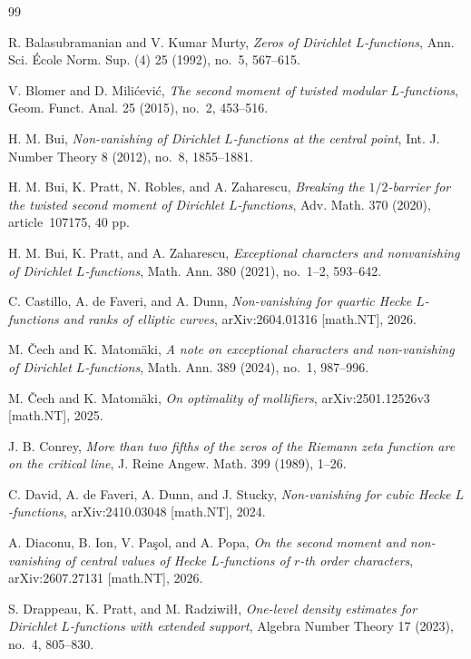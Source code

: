 \documentclass[12pt, a4paper]{amsart}
\numberwithin{equation}{section}
\theoremstyle{plain}
\begin{document}
\begin{thebibliography}{99}

R. Balasubramanian and V. Kumar Murty,
\emph{Zeros of Dirichlet $L$-functions},
Ann. Sci. \'Ecole Norm. Sup. (4) 25 (1992), no.~5, 567--615.

V. Blomer and D. Mili\'cevi\'c,
\emph{The second moment of twisted modular $L$-functions},
Geom. Funct. Anal. 25 (2015), no.~2, 453--516.

H. M. Bui,
\emph{Non-vanishing of Dirichlet $L$-functions at the central point},
Int. J. Number Theory 8 (2012), no.~8, 1855--1881.

H. M. Bui, K. Pratt, N. Robles, and A. Zaharescu, \emph{Breaking the $1/2$-barrier for the twisted second moment of Dirichlet $L$-functions}, Adv. Math. 370 (2020), article~107175, 40 pp.

H. M. Bui, K. Pratt, and A. Zaharescu, \emph{Exceptional characters and nonvanishing of Dirichlet $L$-functions}, Math. Ann. 380 (2021), no.~1--2, 593--642.

C. Castillo, A. de Faveri, and A. Dunn,
\emph{Non-vanishing for quartic Hecke $L$-functions and ranks of elliptic curves},
arXiv:2604.01316 [math.NT], 2026.

M. \v{C}ech and K. Matom\"aki,
\emph{A note on exceptional characters and non-vanishing of Dirichlet
$L$-functions},
Math. Ann. 389 (2024), no.~1, 987--996.

M. \v{C}ech and K. Matom\"aki, \emph{On optimality of mollifiers}, arXiv:2501.12526v3 [math.NT], 2025.

J. B. Conrey, \emph{More than two fifths of the zeros of the Riemann zeta function are on the critical line}, J. Reine Angew. Math. 399 (1989), 1--26.

C. David, A. de Faveri, A. Dunn, and J. Stucky,
\emph{Non-vanishing for cubic Hecke $L$-functions},
arXiv:2410.03048 [math.NT], 2024.

A. Diaconu, B. Ion, V. Pa\c{s}ol, and A. Popa,
\emph{On the second moment and non-vanishing of central values of Hecke $L$-functions of $r$-th order characters},
arXiv:2607.27131 [math.NT], 2026.

S. Drappeau, K. Pratt, and M. Radziwi\l\l, \emph{One-level density estimates for Dirichlet $L$-functions with extended support}, Algebra Number Theory 17 (2023), no.~4, 805--830.


\end{thebibliography}
\end{document}
